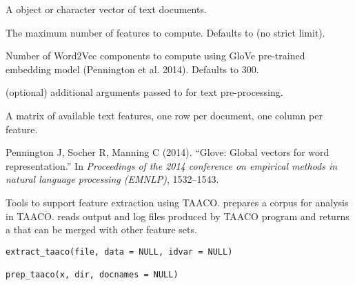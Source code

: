 \documentclass[a4paper]{book}
\begin{document}
%
\begin{Arguments}
\begin{ldescription}
\item[\code{x}] A  object or character vector of text documents.

\item[\code{p\_max}] The maximum number of features to compute. Defaults to  (no strict limit).

\item[\code{glove}] Number of Word2Vec components to compute using GloVe pre-trained embedding model (Pennington et al. 2014).
Defaults to 300.

\item[\code{...}] (optional) additional arguments passed to  for text pre-processing.
\end{ldescription}
\end{Arguments}
%
\begin{Value}
A matrix of available text features, one row per document, one column per feature.
\end{Value}
%
\begin{References}\relax

Pennington J, Socher R, Manning C (2014).
``Glove: Global vectors for word representation.''
In \emph{Proceedings of the 2014 conference on empirical methods in natural language processing (EMNLP)}, 1532--1543.

\end{References}
%
\begin{Description}\relax
Tools to support feature extraction using TAACO.
 prepares a corpus for analysis in TAACO.
 reads output and log files produced by TAACO program and returns a  that can be merged with other feature sets.
\end{Description}
%
\begin{Usage}
\begin{verbatim}
extract_taaco(file, data = NULL, idvar = NULL)

prep_taaco(x, dir, docnames = NULL)
\end{verbatim}
\end{Usage}
%
\end{document}
